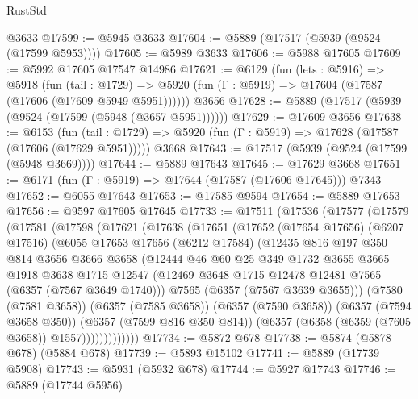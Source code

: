 \begin{lexlean}{RustStd}
\begin{coremodule}
    @3633
@17599 := @5945 @3633
@17604 := @5889 (@17517 (@5939 (@9524 (@17599 @5953))))
@17605 := @5989 @3633
@17606 := @5988 @17605
@17609 := @5992 @17605 @17547 @14986
@17621 := @6129
    (fun (lets : @5916) =>
    @5918
      (fun (tail : @1729) =>
      @5920 (fun (Γ : @5919) => @17604 (@17587 (@17606 (@17609 @5949 @5951))))))
    @3656
@17628 := @5889 (@17517 (@5939 (@9524 (@17599 (@5948 (@3657 @5951))))))
@17629 := @17609 @3656
@17638 := @6153
    (fun (tail : @1729) => @5920 (fun (Γ : @5919) => @17628 (@17587 (@17606 (@17629 @5951)))))
    @3668
@17643 := @17517 (@5939 (@9524 (@17599 (@5948 @3669))))
@17644 := @5889 @17643
@17645 := @17629 @3668
@17651 := @6171 (fun (Γ : @5919) => @17644 (@17587 (@17606 @17645))) @7343
@17652 := @6055 @17643
@17653 := @17585 @9594
@17654 := @5889 @17653
@17656 := @9597 @17605 @17645
@17733 := @17511
    (@17536
      (@17577
        (@17579
          (@17581
            (@17598
              (@17621
                (@17638
                  (@17651
                    (@17652
                      (@17654 @17656)
                      (@6207 @17516)
                      (@6055
                        @17653
                        @17656
                        (@6212 @17584)
                        (@12435
                          @816
                          @197
                          @350
                          @814
                          @3656
                          @3666
                          @3658
                          (@12444
                            @46
                            @60
                            @25
                            @349
                            @1732
                            @3655
                            @3665
                            @1918
                            @3638
                            @1715
                            @12547
                            (@12469 @3648 @1715 @12478 @12481 @7565 (@6357 (@7567 @3649 @1740)))
                            @7565
                            (@6357 (@7567 @3639 @3655)))
                          (@7580 (@7581 @3658))
                          (@6357 (@7585 @3658))
                          (@6357 (@7590 @3658))
                          (@6357 (@7594 @3658 @350))
                          (@6357 (@7599 @816 @350 @814))
                          (@6357 (@6358 (@6359 (@7605 @3658)) @1557)))))))))))))
@17734 := @5872 @678
@17738 := @5874 (@5878 @678) (@5884 @678)
@17739 := @5893 @15102
@17741 := @5889 (@17739 @5908)
@17743 := @5931 (@5932 @678)
@17744 := @5927 @17743
@17746 := @5889 (@17744 @5956)

\end{coremodule}
\end{lexlean}
